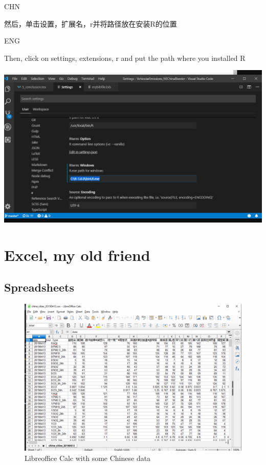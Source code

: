 \documentclass[]{book}
\begin{document}
CHN

然后，单击设置，扩展名，r并将路径放在安装R的位置

ENG

Then, click on settings, extensions, r and put the path where you installed R

\includegraphics{fig/06.png}

\hypertarget{excel-my-old-friend}{%
\chapter{Excel, my old friend}\label{excel-my-old-friend}}

\hypertarget{spreadsheets}{%
\section{Spreadsheets}\label{spreadsheets}}

\begin{figure}
\centering
\includegraphics{fig/07.png}
\caption{\label{fig:unnamed-chunk-10}Libreoffice Calc with some Chinese data}
\end{figure}
\end{document}
